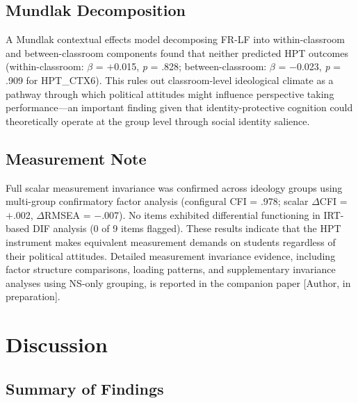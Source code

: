 \documentclass[referee,pdflatex,sn-apa]{sn-jnl}
\begin{document}
\subsection{Mundlak Decomposition}\label{subsec:mundlak}

A Mundlak contextual effects model decomposing FR-LF into within-classroom and between-classroom components found that neither predicted HPT outcomes (within-classroom: $\beta$ = $+$0.015, \textit{p} = .828; between-classroom: $\beta$ = $-$0.023, \textit{p} = .909 for HPT\_CTX6). This rules out classroom-level ideological climate as a pathway through which political attitudes might influence perspective taking performance---an important finding given that identity-protective cognition could theoretically operate at the group level through social identity salience.

\subsection{Measurement Note}\label{subsec:measurement}

Full scalar measurement invariance was confirmed across ideology groups using multi-group confirmatory factor analysis (configural CFI = .978; scalar $\Delta$CFI = $+$.002, $\Delta$RMSEA = $-$.007). No items exhibited differential functioning in IRT-based DIF analysis (0 of 9 items flagged). These results indicate that the HPT instrument makes equivalent measurement demands on students regardless of their political attitudes. Detailed measurement invariance evidence, including factor structure comparisons, loading patterns, and supplementary invariance analyses using NS-only grouping, is reported in the companion paper [Author, in preparation].

\section{Discussion}\label{sec:discussion}

\subsection{Summary of Findings}\label{subsec:summary}
\end{document}
